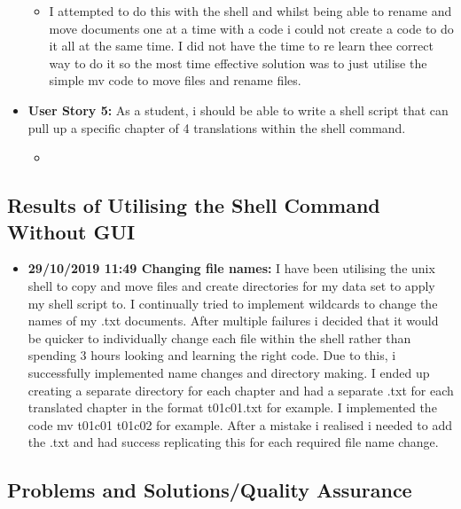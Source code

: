 \documentclass{article}
\begin{document}
\begin{itemize}
\begin{itemize}
\item{I attempted to do this with the shell and whilst being able to rename and move documents one at a time with a code i could not create a code to do it all at the same time. I did not have the time to re learn thee correct way to do it so the most time effective solution was to just utilise the simple mv code to move files and rename files.}
\end{itemize}
\item{\textbf{User Story 5:} As a student, i should be able to write a shell script that can pull up a specific chapter of 4 translations within the shell command.}
\begin{itemize}
\item{} 
\end{itemize}
    
\end{itemize}


\subsection{Results of Utilising the Shell Command Without GUI}

\begin{itemize}
    \item{\textbf{ 29/10/2019 11:49 Changing file names:} I have been utilising the unix shell to copy and move files and create directories for my data set to apply my shell script to. I continually tried to implement wildcards to change the names of my .txt documents. After multiple failures i decided that it would be quicker to individually change each file within the shell rather than spending 3 hours looking and learning the right code. Due to this, i successfully implemented name changes and directory making. I ended up creating a separate directory for each chapter and had a separate .txt for each translated chapter in the format t01c01.txt for example. I implemented the code mv t01c01 t01c02 for example. After a mistake i realised i needed to add the .txt and had success replicating this for each required file name change.} 
\end{itemize}


\subsection{Problems and Solutions/Quality Assurance}
\end{document}
